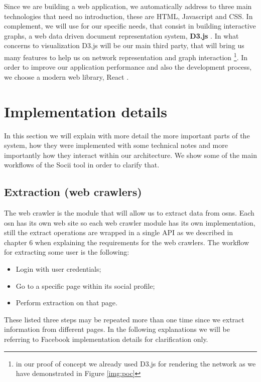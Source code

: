 Since we are building a web application, we automatically address to three main technologies that need no introduction, these are HTML, Javascript and CSS. In complement, we will use for our specific needs, that consist in building interactive graphs, a web data driven document representation system, \textbf{D3.js} \citep{bostock2012d3}. In what concerns to visualization D3.js will be our main third party, that will bring us many features to help us on network representation and graph interaction \footnote{in our proof of concept we already used D3.js for rendering the network as we have demonstrated in Figure \ref{img:poc}}.
In order to improve our application performance and also the development process, we choose a modern web library, React \citep{react}.

\section{Implementation details}

In this section we will explain with more detail the more important parts of the system, how they were implemented with some technical notes and more importantly how they interact within our architecture. We show some of the main workflows of the Socii tool in order to clarify that.

\subsection{Extraction (web crawlers)}
The web crawler is the module that will allow us to extract data from \glspl{osn}. Each \gls{osn} has its own web site so each web crawler module has its own implementation, still the extract operations are wrapped in a single API as we described in chapter 6 when explaining the requirements for the web crawlers. The workflow for extracting some user is the following:
\begin{itemize}
    \item Login with user credentials;
    \item Go to a specific page within its social profile;
    \item Perform extraction on that page.
\end{itemize}
These listed three steps may be repeated more than one time since we extract information from different pages. In the following explanations we will be referring to Facebook implementation details for clarification only.

